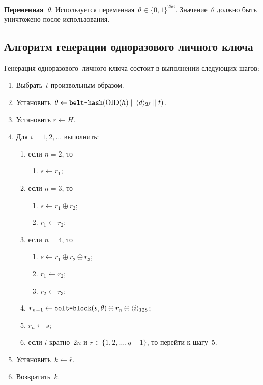 {\bf Переменная~$\theta$}.
Используется переменная~$\theta\in\{0,1\}^{256}$.
Значение~$\theta$ должно быть уничтожено после использования.

\subsection{Алгоритм генерации одноразового личного ключа}
\label{GENK.Alg}

Генерация одноразового~личного ключа 
состоит в выполнении следующих шагов:
\begin{enumerate}
\item
Выбрать~$t$ произвольным образом.
\item
Установить~$\theta\leftarrow\texttt{belt-hash}
(\text{\normalfont OID}(h)\parallel\langle d\rangle_{2\ell}\parallel t)$.
\item
Установить $r\leftarrow H$.
\item
Для $i=1,2,\ldots$ выполнить:
\begin{enumerate}
\item
если $n=2$, то
\begin{enumerate}
\item
$s\leftarrow r_1$;
\end{enumerate}
\item
если $n=3$, то
\begin{enumerate}
\item
$s\leftarrow r_1\oplus r_2$;
\item
$r_1\leftarrow r_2$;
\end{enumerate}
\item
если $n=4$, то
\begin{enumerate}
\item
$s\leftarrow r_1\oplus r_2\oplus r_3$;
\item
$r_1\leftarrow r_2$;
\item
$r_2\leftarrow r_3$;
\end{enumerate}
\item
$r_{n-1}\leftarrow
\texttt{belt-block}(s,\theta)\oplus r_n\oplus\langle i\rangle_{128}$;
\item
$r_n\leftarrow s$;
\item
если $i$ кратно~$2n$ и $\overline{r}\in\{1,2,\ldots,q-1\}$,
то перейти к шагу~5.
\end{enumerate}
\item
Установить~$k\leftarrow \overline{r}$.
\item
Возвратить~$k$.
\end{enumerate}

